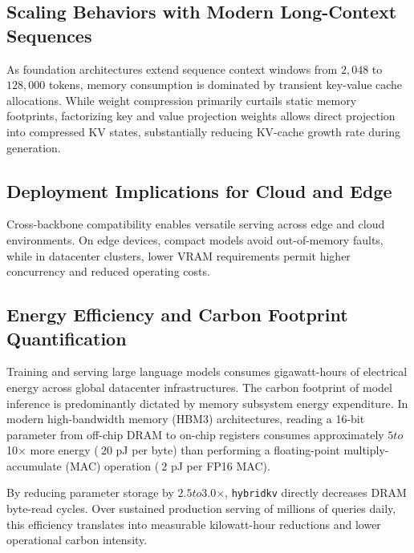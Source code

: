 \subsection{Scaling Behaviors with Modern Long-Context Sequences}
As foundation architectures extend sequence context windows from $2{,}048$ to $128{,}000$ tokens, memory consumption is dominated by transient key-value cache allocations. While weight compression primarily curtails static memory footprints, factorizing key and value projection weights allows direct projection into compressed KV states, substantially reducing KV-cache growth rate during generation.

\subsection{Deployment Implications for Cloud and Edge}
Cross-backbone compatibility enables versatile serving across edge and cloud environments. On edge devices, compact models avoid out-of-memory faults, while in datacenter clusters, lower VRAM requirements permit higher concurrency and reduced operating costs.

\subsection{Energy Efficiency and Carbon Footprint Quantification}
Training and serving large language models consumes gigawatt-hours of electrical energy across global datacenter infrastructures. The carbon footprint of model inference is predominantly dictated by memory subsystem energy expenditure. In modern high-bandwidth memory (HBM3) architectures, reading a 16-bit parameter from off-chip DRAM to on-chip registers consumes approximately $5$\times$ to $10$\times$ more energy ($~20$ pJ per byte) than performing a floating-point multiply-accumulate (MAC) operation ($~2$ pJ per FP16 MAC).

By reducing parameter storage by $2.5$\times$ to $3.0$\times$, \texttt{hybridkv} directly decreases DRAM byte-read cycles. Over sustained production serving of millions of queries daily, this efficiency translates into measurable kilowatt-hour reductions and lower operational carbon intensity.
